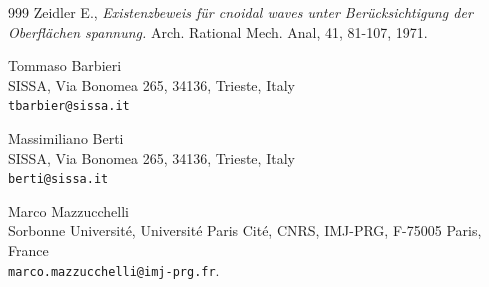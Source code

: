\documentclass[11pt,a4paper,reqno]{article}
\numberwithin{equation}{section}
\theoremstyle{definition}
\begin{document}
\begin{footnotesize}
\begin{thebibliography}{999}
    Zeidler E., {\it Existenzbeweis f\"ur cnoidal waves unter Ber\"ucksichtigung der Oberfl\"achen spannung.} Arch. Rational Mech. Anal, 41, 81-107, 1971.


\end{thebibliography}


\vspace{7pt}
\noindent 
Tommaso Barbieri\\ 
SISSA, Via Bonomea 265, 34136, Trieste, Italy\\ 
\texttt{tbarbier@sissa.it}

\vspace{3pt}

\noindent 
Massimiliano Berti\\ 
SISSA, Via Bonomea 265, 34136, Trieste, Italy\\ 
\texttt{berti@sissa.it}

\vspace{3pt}

\noindent
Marco Mazzucchelli\\ 
Sorbonne Université, Université Paris Cité, CNRS, IMJ-PRG, F-75005 Paris, France\\ 
\texttt{marco.mazzucchelli@imj-prg.fr}.

\end{footnotesize}


\newpage


\makeatletter
\providecommand\@dotsep{5}
\renewcommand{\listoftodos}[1][\@todonotes@todolistname]{%
  \@starttoc{tdo}{#1}}
\makeatother
\end{document}
